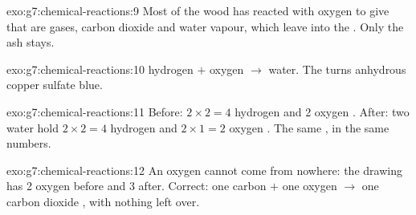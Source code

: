 \begin{solution}{exo:g7:chemical-reactions:9}
Most of the wood has reacted with oxygen to give  that are
gases, carbon dioxide and water vapour, which leave into the . Only
the ash stays.
\end{solution}

\begin{solution}{exo:g7:chemical-reactions:10}
hydrogen $+$ oxygen $\longrightarrow$ water. The  turns anhydrous
copper sulfate blue.
\end{solution}

\begin{solution}{exo:g7:chemical-reactions:11}
Before: $2 \times 2 = 4$ hydrogen  and 2 oxygen . After: two
water  hold $2 \times 2 = 4$ hydrogen  and $2 \times 1 =
2$ oxygen . The same , in the same numbers.
\end{solution}

\begin{solution}{exo:g7:chemical-reactions:12}
An oxygen  cannot come from nowhere: the drawing has 2 oxygen 
before and 3 after. Correct: one carbon  $+$ one oxygen 
$\longrightarrow$ one carbon dioxide , with nothing left over.
\end{solution}

